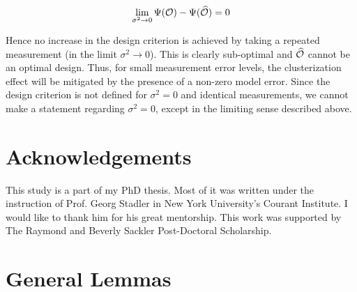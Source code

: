 \documentclass{amsart}
\numberwithin{equation}{section}
\begin{document}
$$
\lim_{\sigma^2 \to 0} \Psi(\mathcal{O}) -\Psi(\widehat{\mathcal{O}}) = 0
$$

Hence no increase in the design criterion is achieved by taking a
repeated measurement (in the limit $\sigma^2 \to 0$). This is clearly
sub-optimal and $\widehat{\mathcal{O}}$ cannot be an optimal design. Thus, for small
measurement error levels, the clusterization effect will be mitigated
by the presence of a non-zero model error. Since the design criterion
is not defined for $\sigma^2 = 0$ and identical measurements, we
cannot make a statement regarding $\sigma^2 = 0$, except in the
limiting sense described above.




\section{Acknowledgements}
This study is a part of my PhD thesis. Most of it was written under
the instruction of Prof. Georg Stadler in New York University's
Courant Institute. I would like to thank him for his great
mentorship. This work was supported by The Raymond and Beverly Sackler
Post-Doctoral Scholarship.

\appendix
\section{General Lemmas}
\end{document}

